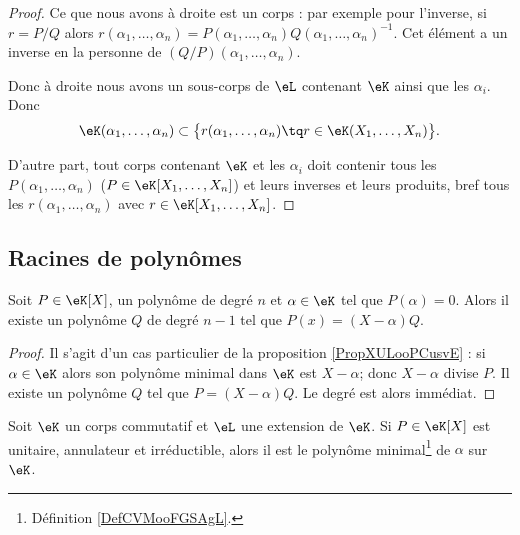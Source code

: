 \begin{proof}
    Ce que nous avons à droite est un corps : par exemple pour l'inverse, si \( r=P/Q\) alors \( r(\alpha_1,\ldots,\alpha_n)=P(\alpha_1,\ldots, \alpha_n)Q(\alpha_1,\ldots, \alpha_n)^{-1}\). Cet élément a un inverse en la personne de \( (Q/P)(\alpha_1,\ldots, \alpha_n)\).

    Donc à droite nous avons un sous-corps de \( \eL\) contenant \( \eK\) ainsi que les \( \alpha_i\). Donc
    \begin{equation}
        \eK(\alpha_1,\ldots, \alpha_n)\subset \big\{ r(\alpha_1,\ldots, \alpha_n)\tq r\in \eK(X_1,\ldots, X_n) \big\}.
    \end{equation}
    
    D'autre part, tout corps contenant \( \eK\) et les \( \alpha_i\) doit contenir tous les \( P(\alpha_1,\ldots, \alpha_n)\) (\( P\in \eK[X_1,\ldots, X_n]\)) et leurs inverses et leurs produits, bref tous les \( r(\alpha_1,\ldots, \alpha_n)\) avec \( r\in\eK[X_1,\ldots, X_n]\).
\end{proof}

\subsection{Racines de polynômes}

\begin{corollary}   \label{CorDIYooEtmztc}
    Soit \( P\in \eK[X]\), un polynôme de degré \( n\) et \( \alpha\in \eK\) tel que \( P(\alpha)=0\). Alors il existe un polynôme \( Q\) de degré \( n-1\) tel que \( P(x)=(X-\alpha)Q\).
\end{corollary}

\begin{proof}
    Il s'agit d'un cas particulier de la proposition \ref{PropXULooPCusvE} : si \( \alpha\in \eK\) alors son polynôme minimal dans \( \eK\) est \( X-\alpha\); donc \( X-\alpha\) divise \( P\). Il existe un polynôme \( Q\) tel que \( P=(X-\alpha)Q\). Le degré est alors immédiat.
\end{proof}

\begin{corollary}   \label{CorKZIooLPUjaf}
    Soit \( \eK\) un corps commutatif et \( \eL\) une extension de \( \eK\). Si \( P\in\eK[X]\) est unitaire, annulateur et irréductible, alors il est le polynôme minimal\footnote{Définition \ref{DefCVMooFGSAgL}.} de \( \alpha\) sur \( \eK\).
\end{corollary}

